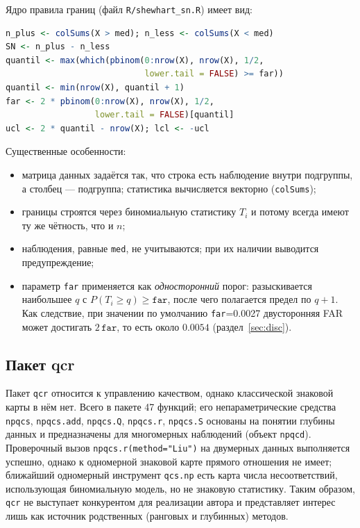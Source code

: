 \documentclass[11pt,a4paper]{article}
\begin{document}
Ядро правила границ (файл \texttt{R/shewhart\_sn.R}) имеет вид:
\begin{lstlisting}[language=R]
n_plus <- colSums(X > med); n_less <- colSums(X < med)
SN <- n_plus - n_less
quantil <- max(which(pbinom(0:nrow(X), nrow(X), 1/2,
                            lower.tail = FALSE) >= far))
quantil <- min(nrow(X), quantil + 1)
far <- 2 * pbinom(0:nrow(X), nrow(X), 1/2,
                  lower.tail = FALSE)[quantil]
ucl <- 2 * quantil - nrow(X); lcl <- -ucl
\end{lstlisting}
Существенные особенности:
\begin{itemize}[itemsep=1pt]
  \item матрица данных задаётся так, что строка есть наблюдение внутри
        подгруппы, а столбец --- подгруппа; статистика вычисляется векторно
        (\texttt{colSums});
  \item границы строятся через биномиальную статистику $T_i$ и потому всегда
        имеют ту же чётность, что и $n$;
  \item наблюдения, равные \texttt{med}, не учитываются; при их наличии
        выводится предупреждение;
  \item параметр \texttt{far} применяется как \emph{односторонний} порог:
        разыскивается наибольшее $q$ с $P(T_i\ge q)\ge\texttt{far}$, после
        чего полагается предел по $q+1$. Как следствие, при значении по
        умолчанию \texttt{far}=0.0027 двусторонняя FAR может достигать
        $2\,\texttt{far}$, то есть около $0.0054$ (раздел~\ref{sec:disc}).
\end{itemize}

\subsection{Пакет qcr}

Пакет \texttt{qcr} \cite{Flores2021} относится к управлению качеством, однако
классической знаковой карты в нём нет. Всего в пакете 47 функций; его
непараметрические средства \texttt{npqcs}, \texttt{npqcs.add},
\texttt{npqcs.Q}, \texttt{npqcs.r}, \texttt{npqcs.S} основаны на понятии
глубины данных \cite{Liu1995} и предназначены для многомерных наблюдений
(объект \texttt{npqcd}). Проверочный вызов \texttt{npqcs.r(method="Liu")} на
двумерных данных выполняется успешно, однако к одномерной знаковой карте
прямого отношения не имеет; ближайший одномерный инструмент
\texttt{qcs.np} есть карта числа несоответствий, использующая биномиальную
модель, но не знаковую статистику. Таким образом, \texttt{qcr} не выступает
конкурентом для реализации автора и представляет интерес лишь как
источник родственных (ранговых и глубинных) методов.
\end{document}
